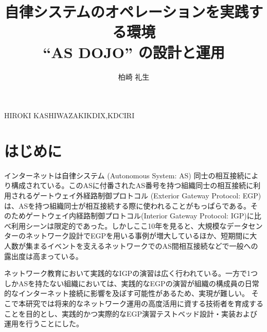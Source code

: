 \documentclass[Japanese]{dicomopapers}
\begin{document}
\title{自律システムのオペレーションを実践する環境\\ ``AS DOJO'' の設計と運用}



\author{柏崎 礼生}{HIROKI KASHIWAZAKI}{KDIX,KDCIRI}

\maketitle

\section{はじめに}

インターネットは自律システム (Autonomous System: AS) 同士の相互接続により構成されている。このASに付番されたAS番号を持つ組織同士の相互接続に利用されるゲートウェイ外経路制御プロトコル (Exterior Gateway Protocol: EGP) は、ASを持つ組織同士が相互接続する際に使われることがもっぱらである。そのためゲートウェイ内経路制御プロトコル(Interior Gateway Protocol: IGP)に比べ利用シーンは限定的であった。しかしここ10年を見ると、大規模なデータセンターのネットワーク設計でEGPを用いる事例が増大しているほか、短期間に大人数が集まるイベントを支えるネットワークでのAS間相互接続などで一般への露出度は高まっている。


ネットワーク教育において実践的なIGPの演習は広く行われている。一方で1つしかASを持たない組織においては、実践的なEGPの演習が組織の構成員の日常的なインターネット接続に影響を及ぼす可能性があるため、実現が難しい。
そこで本研究では将来的なネットワーク運用の高度活用に資する技術者を育成することを目的とし、実践的かつ実際的なEGP演習テストベッド設計・実装および運用を行うことにした。
\end{document}
